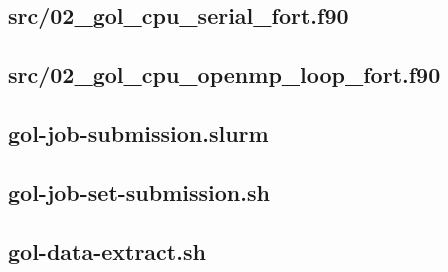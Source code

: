 \documentclass[]{article}
\begin{document}


\newpage
\subsection{src/02\_gol\_cpu\_serial\_fort.f90}
\label{sec:02_gol_cpu_serial_fort}



\newpage
\subsection{src/02\_gol\_cpu\_openmp\_loop\_fort.f90}
\label{sec:02_gol_cpu_openmp_loop_fort}



\newpage
\subsection{gol-job-submission.slurm}
\label{sec:gol-job-submission}



\newpage
\subsection{gol-job-set-submission.sh}
\label{sec:gol-job-set-submission}



\newpage
\subsection{gol-data-extract.sh}
\label{sec:gol-data-extract}


\end{document}
